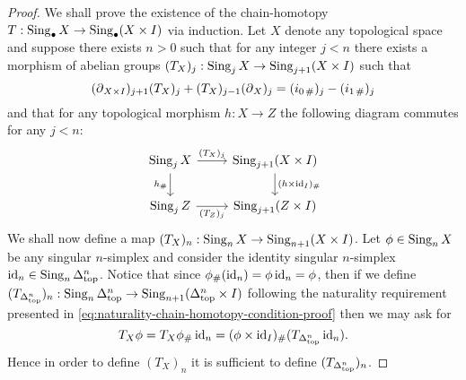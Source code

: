 \begin{proof}
We shall prove the existence of the chain-homotopy
\(T: \operatorname{Sing}_{\bullet} X \to \operatorname{Sing}_{\bullet}(X \times I)\) via induction. Let
\(X\) denote any topological space and suppose there exists \(n > 0\) such that
for any integer \(j < n\) there exists a morphism of abelian groups \((T_X)_j:
\operatorname{Sing}_j X \to \operatorname{Sing}_{j+1}(X \times I)\) such that
\begin{equation}\label{eq:chain-homotopy-condition-proof}
(\operatorname{\partial}_{X \times I})_{j+1} (T_X)_j + (T_X)_{j-1} (\operatorname{\partial}_X)_j
= (i_{0\, \#})_j - (i_{1\, \#})_j
\end{equation}
and that for any topological morphism \(h: X \to Z\) the following diagram
commutes for any \(j < n\):
\begin{equation}\label{eq:naturality-chain-homotopy-condition-proof}
\begin{tikzcd}
\Sing_j X \ar[r, "(T_X)_j"] \ar[d, "h_{\#}"']
&\Sing_{j+1}(X \times I) \ar[d, "(h \times \Id_I)_{\#}"] \\
\Sing_j Z \ar[r, "(T_Z)_j"']
&\Sing_{j+1}(Z \times I)
\end{tikzcd}
\end{equation}
We shall now define a map \((T_X)_n: \operatorname{Sing}_n X \to \operatorname{Sing}_{n+1}(X \times
I)\). Let \(\phi \in \operatorname{Sing}_n X\) be any singular \(n\)-simplex and consider the
identity singular \(n\)-simplex \(\operatorname{id}_n \in \operatorname{Sing}_n \Delta_{\text{top}}^n\). Notice that
since \(\phi_{\#}(\operatorname{id}_n) = \phi \operatorname{id}_n = \phi\), then if we define
\((T_{\Delta_{\text{top}}^n})_n: \operatorname{Sing}_n\Delta_{\text{top}}^n \to \operatorname{Sing}_{n+1}(\Delta_{\text{top}}^n \times I)\)
following the naturality requirement presented in
\cref{eq:naturality-chain-homotopy-condition-proof} then we may ask for
\begin{equation}\label{eq:T-X-n-phi-chain-homotopy}
T_X\phi = T_X \phi_{\#}\operatorname{id}_n
= (\phi \times \operatorname{id}_I)_{\#}(T_{\Delta_{\text{top}}^n} \operatorname{id}_n).
\end{equation}
Hence in order to define \((T_X)_n\) it is sufficient to define
\((T_{\Delta_{\text{top}}^n})_n\).


\end{proof}
